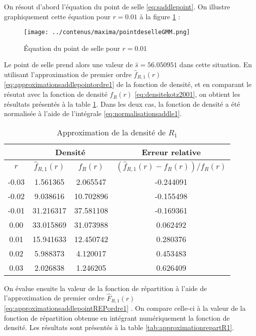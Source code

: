 On résout d'abord l'équation du point de selle
\eqref{eq:saddlepoint}. On illustre graphiquement cette équation pour
$r=0.01$ à la figure \ref{fig:equationptselle0.01R1} :
\begin{figure}[!ht]
  \centering
  \texttt{[image: ../contenus/maxima/pointdeselleGMM.png]}
  \caption{Équation du point de selle pour $r=0.01$}
  \label{fig:equationptselle0.01R1}
\end{figure}

Le point de selle prend alors une valeur de $\hat{s}=56.050951$ dans
cette situation. En utilisant l'approximation de premier ordre
$\hat{f}_{R,1}(r)$
\eqref{eq:approximationsaddlepointordre1} %
de la fonction de densité, et en comparant le résutat avec la fonction
de densité ${f}_{R}(r)$ \eqref{eq:densitekotz2001}, on obtient les
résultats présentés à la table \ref{tab:approximationdensiteR1}. Dans
les deux cas, la fonction de densité a été normalisée à l'aide de
l'intégrale \eqref{eq:normalisationsaddle1}.

\begin{table}[ht]
  \centering
  \begin{tabular}{cccc}
    & \multicolumn{2}{c}{\textbf{Densité}} & \multicolumn{1}{c}{\textbf{Erreur relative}} \\
    \hline
    $r$ & $\hat{f}_{R,1}(r)$ & ${f}_{R}(r)$ & $(\hat{f}_{R,1}(r)-{f}_{R}(r))/{{f}_{R}(r)}$ \\ 
    \hline
    -0.03 & 1.561365 & 2.065547 & -0.244091 \\ 
    -0.02 & 9.038616 & 10.702896 & -0.155498 \\ 
    -0.01 & 31.216317 & 37.581108 & -0.169361 \\ 
    0.00 & 33.015869 & 31.073988 & 0.062492 \\ 
    0.01 & 15.941633 & 12.450742 & 0.280376 \\ 
    0.02 & 5.988373 & 4.120017 & 0.453483 \\ 
    0.03 & 2.026838 & 1.246205 & 0.626409 \\ 
    \hline
  \end{tabular}
  \caption{Approximation de la densité de $R_1$}
  \label{tab:approximationdensiteR1}
\end{table}

On évalue ensuite la valeur de la fonction de répartition à l'aide de
l'approximation de premier ordre $\hat{F}_{R,1}(r)$
\eqref{eq:approximationsaddlepointREPordre1} %
. On compare celle-ci à la valeur de la fonction de répartition
obtenue en intégrant numériquement la fonction de densité. Les
résultats sont présentés à la table \ref{tab:approximationrepartR1}.

